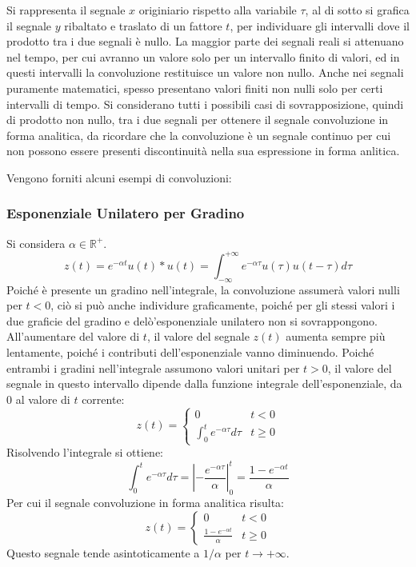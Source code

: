 \documentclass{article}
\numberwithin{equation}{subsection}
\begin{document}
Si rappresenta il segnale $x$ originiario rispetto alla variabile $\tau$, al di sotto si grafica il segnale $y$ ribaltato e traslato di un fattore $t$, per individuare gli 
intervalli dove il prodotto tra i due segnali è nullo. La maggior parte dei segnali reali si attenuano nel tempo, per cui avranno un valore solo per un intervallo finito 
di valori, ed in questi intervalli la convoluzione restituisce un valore non nullo. Anche nei segnali puramente matematici, spesso presentano valori finiti non nulli solo per 
certi intervalli di tempo. Si considerano tutti i possibili casi di sovrapposizione, quindi di prodotto non nullo, tra i due segnali per ottenere 
il segnale convoluzione in forma analitica, da ricordare che la convoluzione è un segnale continuo per cui non possono essere presenti discontinuità nella sua espressione 
in forma anlitica. 



Vengono forniti alcuni esempi di convoluzioni:

\subsubsection{Esponenziale Unilatero per Gradino}

Si considera $\alpha\in\mathbb{R}^+$. 
\begin{equation*}
    z(t)=e^{-\alpha t}u(t)*u(t)=\displaystyle\int_{-\infty}^{+\infty}e^{-\alpha\tau}u(\tau)u(t-\tau)d\tau
\end{equation*}
Poiché è presente un gradino nell'integrale, la convoluzione assumerà valori nulli per $t<0$, ciò si può anche individure graficamente, poiché per gli stessi valori i due 
graficie del gradino e delò'esponenziale unilatero non si sovrappongono. All'aumentare del valore di $t$, il valore del segnale $z(t)$ aumenta sempre più lentamente, poiché i 
contributi dell'esponenziale vanno diminuendo. Poiché entrambi i gradini nell'integrale assumono valori unitari per $t>0$, il valore del segnale in questo intervallo 
dipende dalla funzione integrale dell'esponenziale, da $0$ al valore di $t$ corrente:
\begin{equation*}
    z(t)=\begin{cases}
        0&t<0\\
        \displaystyle\int_0^te^{-\alpha \tau}d\tau&t\geq0
    \end{cases}
\end{equation*}
Risolvendo l'integrale si ottiene:
\begin{equation*}
    \displaystyle\int_0^te^{-\alpha \tau}d\tau=\left|-\frac{e^{-\alpha\tau}}{\alpha}\right|^t_0=\frac{1-e^{-\alpha t}}{\alpha}
\end{equation*}
Per cui il segnale convoluzione in forma analitica risulta:
\begin{equation*}
    z(t)=\begin{cases}
        0&t<0\\
        \displaystyle\frac{1-e^{-\alpha t}}{\alpha}&t\geq0
    \end{cases}
\end{equation*}
Questo segnale tende asintoticamente a $1/\alpha$ per $t\to+\infty$. 
\end{document}
